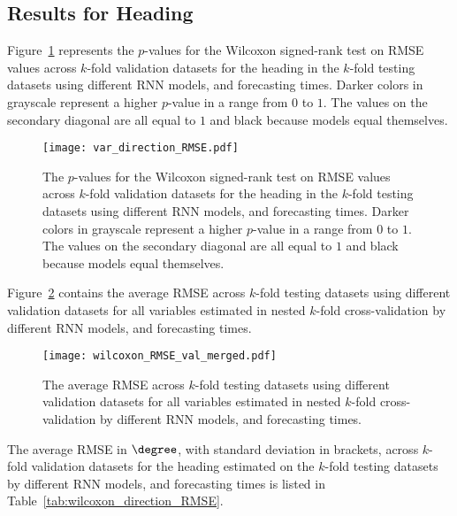 \subsection{Results for Heading}

Figure~\ref{fig:var_direction_RMSE} represents the $p$-values for the Wilcoxon signed-rank test on RMSE values across $k$-fold validation datasets for the heading in the $k$-fold testing datasets using different RNN models, and forecasting times. Darker colors in grayscale represent a higher $p$-value in a range from $0$ to $1$. The values on the secondary diagonal are all equal to $1$ and black because models equal themselves.

\begin{figure}[!ht]
	\centering
	\texttt{[image: var\_direction\_RMSE.pdf]}
	\caption{The $p$-values for the Wilcoxon signed-rank test on RMSE values across $k$-fold validation datasets for the heading in the $k$-fold testing datasets using different RNN models, and forecasting times. Darker colors in grayscale represent a higher $p$-value in a range from $0$ to $1$. The values on the secondary diagonal are all equal to $1$ and black because models equal themselves.}
	\label{fig:var_direction_RMSE}
\end{figure}

Figure~\ref{fig:wilcoxon_RMSE_val_merged} contains the average RMSE across $k$-fold testing datasets using different validation datasets for all variables estimated in nested $k$-fold cross-validation by different RNN models, and forecasting times.

\begin{figure}[!ht]
	\centering
	\texttt{[image: wilcoxon\_RMSE\_val\_merged.pdf]}
	\caption{The average RMSE across $k$-fold testing datasets using different validation datasets for all variables estimated in nested $k$-fold cross-validation by different RNN models, and forecasting times.}
	\label{fig:wilcoxon_RMSE_val_merged}
\end{figure}

The average RMSE in $\degree$, with standard deviation in brackets, across $k$-fold validation datasets for the heading estimated on the $k$-fold testing datasets by different RNN models, and forecasting times is listed in Table~\ref{tab:wilcoxon_direction_RMSE}.

